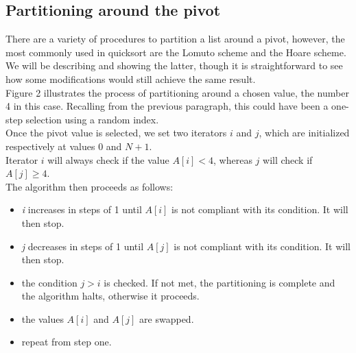 \documentclass[]{finalproject}
\begin{document}
\subsection{Partitioning around the pivot}
There are a variety of procedures to partition a list around a pivot, however, the most commonly used in quicksort are the Lomuto scheme and the Hoare scheme.
We will be describing and showing the latter, though it is straightforward to see how some modifications would still achieve the same result.\\
Figure 2 illustrates the process of partitioning around a chosen value, the number 4 in this case. Recalling from the previous paragraph, this could have been a one-step selection using a random index.\\
Once the pivot value is selected, we set two iterators $i$ and $j$, which are initialized respectively at values $0$ and $N+1$.\\
Iterator $i$ will always check if the value $A[i] < 4$, whereas $j$ will check if $A[j] \geq 4$.\\
The algorithm then proceeds as follows:\\

\begin{itemize}[partopsep=0pt, parsep=0.3pt, topsep=-\parskip, itemsep=1pt]
  \item{} \textit{i} increases in steps of 1 until $A[i]$ is not compliant with its condition. It will then stop.
  \item{} \textit{j} decreases in steps of 1 until $A[j]$ is not compliant with its condition. It will then stop.
  \item{} the condition $j>i$ is checked. If not met, the partitioning is complete and the algorithm halts, otherwise it proceeds.
  \item{} the values $A[i]$ and $A[j]$ are swapped.
  \item{} repeat from step one. 
\end{itemize}
\end{document}
